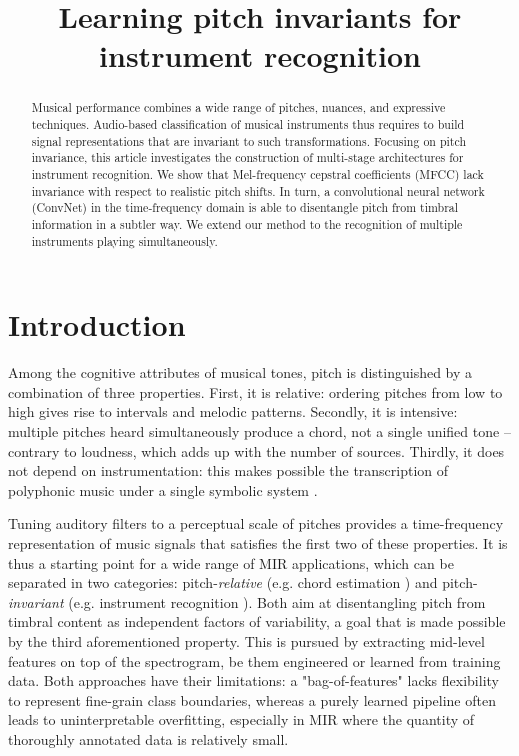 \documentclass{article}
\title{Learning pitch invariants for instrument recognition}
\makeatletter
\newcommand*{\eg}{e.g.\@\xspace}
\makeatother
\begin{document}
%
\maketitle
%
\begin{abstract}
Musical performance combines a wide range of pitches, nuances,
and expressive techniques.
Audio-based classification of musical instruments thus requires to
build signal representations that are invariant to such transformations.
Focusing on pitch invariance, this article investigates the construction
of multi-stage architectures for instrument recognition.
We show that Mel-frequency cepstral coefficients (MFCC) lack
invariance with respect to realistic pitch shifts.
In turn, a convolutional neural network (ConvNet) in the time-frequency
domain is able to disentangle pitch from timbral information in a subtler way.
We extend our method to the recognition of multiple instruments playing simultaneously.
\end{abstract}

\section{Introduction}\label{sec:introduction}
Among the cognitive attributes of musical tones, pitch is distinguished
by a combination of three properties.
First, it is relative: ordering pitches from low to high gives rise to
intervals and melodic patterns.
Secondly, it is intensive: multiple pitches heard simultaneously produce
a chord, not a single unified tone -- contrary to loudness, which adds
up with the number of sources.
Thirdly, it does not depend on instrumentation: this makes possible
the transcription of polyphonic music under a single symbolic system \cite{Krumhansl2001}.

Tuning auditory filters to a perceptual scale of pitches provides a
time-frequency representation of music signals that satisfies the first two of these properties.
It is thus a starting point for a wide range of MIR applications,
which can be separated in two categories: pitch-\emph{relative}
(\eg chord estimation \cite{Humphrey2012})
and pitch-\emph{invariant} (\eg instrument recognition \cite{Eronen2000}).
Both aim at disentangling pitch from timbral content as independent
factors of variability, a goal that is made possible by the third aforementioned property.
This is pursued by extracting mid-level features on top of the spectrogram,
be them engineered or learned from training data.
Both approaches have their limitations: a "bag-of-features" lacks flexibility
to represent fine-grain class boundaries, whereas a purely learned pipeline
often leads to uninterpretable overfitting, especially in MIR where the quantity
of thoroughly annotated data is relatively small.
\end{document}
